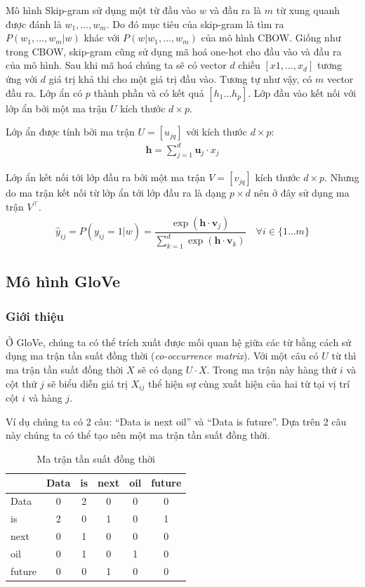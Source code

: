 Mô hình Skip-gram sử dụng một từ đầu vào $w$ và đầu ra là $m$ từ xung quanh được đánh là $w_1,\dots,w_m$. Do đó mục tiêu của skip-gram là tìm ra $P(w_1,\dots,w_m|w)$ khác với $P(w|w_1,\dots,w_m)$ của mô hình CBOW. Giống như trong CBOW, skip-gram cũng sử dụng mã hoá one-hot cho đầu vào và đầu ra của mô hình. Sau khi mã hoá chúng ta sẽ có vector $d$ chiều $[x1,\dots,x_d]$ tương ứng với $d$ giá trị khả thi cho một giá trị đầu vào. Tương tự như vậy, có $m$ vector đầu ra. Lớp ẩn có $p$ thành phần và có kết quả $[h_1\dots h_p]$. Lớp đầu vào kết nối với lớp ẩn bởi một ma trận $U$ kích thước $d\times p$.

Lớp ẩn được tính bởi ma trận $U = [u_{jq}]$ với kích thước $d\times p$:
\begin{align}
    \mathbf h=\sum_{j=1}^d \mathbf u_j\cdot x_j
\end{align}

Lớp ẩn kết nối tới lớp đầu ra bởi một ma trận $V=[v_{jq}]$ kích thước $d\times p$. Nhưng do ma trận kết nối từ lớp ẩn tới lớp đầu ra là dạng $p\times d$ nên ở đây sử dụng ma trận $V^\intercal$.
\begin{align}
    \hat y_{ij}=P(y_{ij}=1|w)=\dfrac{\exp(\mathbf h\cdot\mathbf v_j)}{\sum_{k=1}^d\exp(\mathbf h\cdot\mathbf v_k)}\quad\forall i\in\{1\dots m\}
\end{align}

\subsection{Mô hình GloVe}
\subsubsection{Giới thiệu}
Ở GloVe, chúng ta có thể trích xuất được mối quan hệ giữa các từ bằng cách sử dụng ma trận tần suất đồng thời (\textit{co-occurrence matrix}). Với một câu có $U$ từ thì ma trận tần suất đồng thời $X$ sẽ có dạng $U\cdot X$. Trong ma trận này hàng thứ $i$ và cột thứ $j$ sẽ biểu diễn giá trị $X_{ij}$ thể hiện sự cùng xuất hiện của hai từ tại vị trí cột $i$ và hàng $j$.

Ví dụ chúng ta có 2 câu: ``Data is next oil'' và ``Data is future''. Dựa trên 2 câu này chúng ta có thể tạo nên một ma trận tần suất đồng thời.
\begin{table}[htb]
    \centering
    \caption{Ma trận tần suất đồng thời \cite{webpage9}}
    \label{table:frequency-matrix}
    \begin{tabular}{ l c c c c c }
        \toprule
               & Data & is & next & oil & future \\\midrule
        Data   & 0    & 2  & 0    & 0   & 0      \\
        is     & 2    & 0  & 1    & 0   & 1      \\
        next   & 0    & 1  & 0    & 0   & 0      \\
        oil    & 0    & 1  & 0    & 1   & 0      \\
        future & 0    & 0  & 1    & 0   & 0      \\
        \bottomrule
    \end{tabular}
\end{table}

